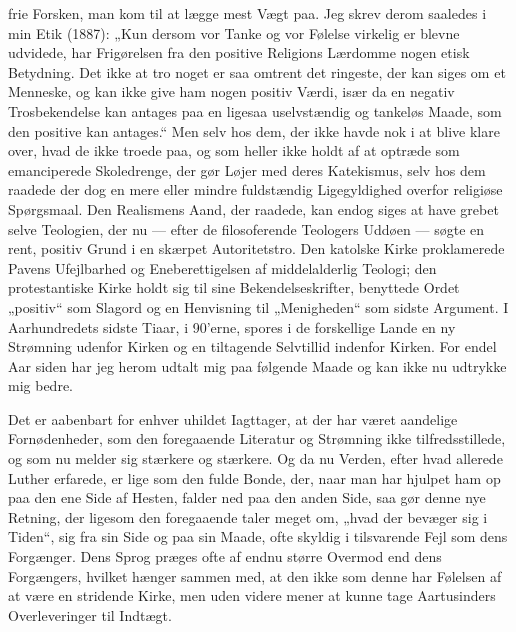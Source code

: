 \documentclass[12pt,a4paper,openany]{book}
\newcommand{\opage}[1]{\marginnote{\footnotesize\textit{[#1]}}}
\begin{document}
frie Forsken, man kom til at lægge mest Vægt paa. Jeg skrev derom
saaledes i min Etik (1887): „Kun dersom vor Tanke og vor Følelse
virkelig er blevne udvidede, har Frigørelsen fra den positive Religions
Lærdomme nogen etisk Betydning. Det ikke at tro noget er saa
omtrent det ringeste, der kan siges om et Menneske, og kan ikke
give ham nogen positiv Værdi, især da en negativ Trosbekendelse
kan antages paa en ligesaa uselvstændig og tankeløs Maade, som
den positive kan antages.“ Men selv hos dem, der ikke havde nok i
at blive klare over, hvad de ikke troede paa, og som heller ikke
holdt af at optræde som emanciperede Skoledrenge, der gør Løjer
med deres Katekismus, selv hos dem raadede der dog en mere eller
mindre fuldstændig Ligegyldighed overfor religiøse Spørgsmaal. Den
Realismens Aand, der raadede, kan endog siges at have grebet selve
Teologien, der nu --- efter de filosoferende Teologers Uddøen ---
søgte en rent, positiv Grund i en skærpet Autoritetstro. Den katolske
Kirke proklamerede Pavens Ufejlbarhed og Eneberettigelsen af
middelalderlig Teologi; den protestantiske Kirke holdt sig til sine Bekendelseskrifter,
benyttede Ordet „positiv“ som Slagord og en Henvisning
til „Menigheden“ som sidste Argument.
I Aarhundredets sidste Tiaar, i 90'erne, spores i de forskellige
Lande en ny Strømning udenfor Kirken og en tiltagende Selvtillid
indenfor Kirken. For endel Aar siden har jeg herom udtalt mig paa
følgende Maade og kan ikke nu udtrykke mig bedre.

Det er aabenbart for enhver uhildet Iagttager, at der har været
aandelige Fornødenheder, som den foregaaende Literatur og Strømning
ikke tilfredsstillede, og som nu melder sig stærkere og stærkere.
Og da nu Verden, efter hvad allerede Luther erfarede, er lige som
den fulde Bonde, der, naar man har hjulpet ham op paa den ene
\opage{148}Side af Hesten, falder ned paa den anden Side, saa gør denne nye
Retning, der ligesom den foregaaende taler meget om, „hvad der
bevæger sig i Tiden“, sig fra sin Side og paa sin Maade, ofte skyldig
i tilsvarende Fejl som dens Forgænger. Dens Sprog præges ofte af
endnu større Overmod end dens Forgængers, hvilket hænger sammen
med, at den ikke som denne har Følelsen af at være en stridende
Kirke, men uden videre mener at kunne tage Aartusinders
Overleveringer til Indtægt.
\end{document}
